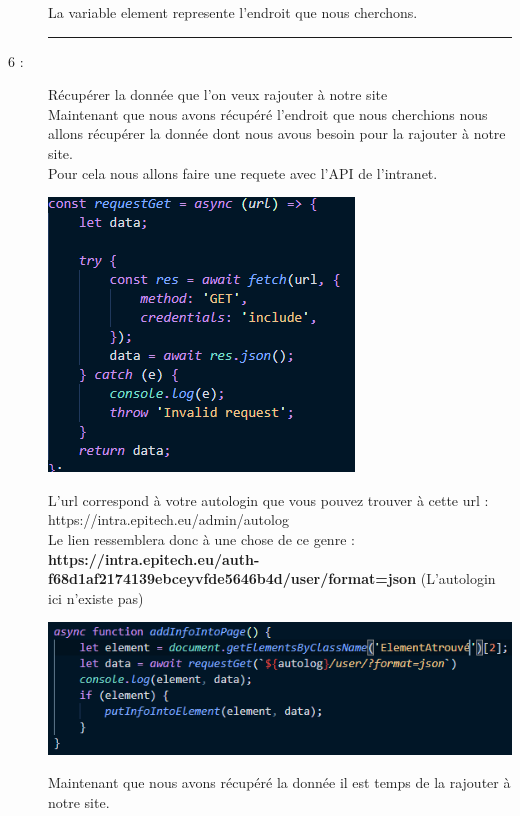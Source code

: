 \documentclass{article}
\begin{document}
\begin{description}
\begin{center}
        \end{center}
        La variable element represente l'endroit que nous cherchons.
        \begin{center}
            \rule{0.75\linewidth}{1pt}
        \end{center}
        \item[6 :]{Récupérer la donnée que l'on veux rajouter à notre site} \\ Maintenant que nous avons récupéré l'endroit que nous cherchions nous allons récupérer la donnée dont nous avous besoin pour la rajouter à notre site.
        \\ Pour cela nous allons faire une requete avec l'API de l'intranet.
        \begin{center}
            \includegraphics[scale=0.9]{requestGetSansLib.PNG}
        \end{center}
        L'url correspond à votre autologin que vous pouvez trouver à cette url : https://intra.epitech.eu/admin/autolog
        \\ Le lien ressemblera donc à une chose de ce genre : \\ \textbf{https://intra.epitech.eu/auth-f68d1af2174139ebceyvfde5646b4d/user/format=json} (L'autologin ici n'existe pas)
        \begin{center}
            \includegraphics[scale=0.8]{indexjspremierePartie.PNG}
        \end{center}
        Maintenant que nous avons récupéré la donnée il est temps de la rajouter à notre site.

\end{description}
\end{document}
